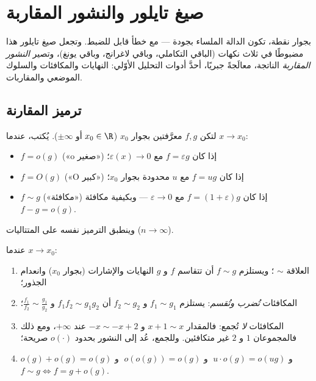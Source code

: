 \chapter{صيغ تايلور والنشور المقاربة}\label{ch:b1:taylor}

بجوار نقطة، تكون الدالة الملساء بجودة  --- مع خطأ
قابل للضبط. وتجعل صيغ تايلور هذا مضبوطًا في ثلاث
نكهات (الباقي التكاملي، وباقي لاغرانج، وباقي يونغ)،
وتصير \emph{النشور المقاربة} الناتجة، معالَجةً
جبريًا، أحدَّ أدوات التحليل الأوّلي:
النهايات والمكافئات والسلوك الموضعي والمقاربات.

\section{ترميز المقارنة}

\begin{definition}\label{def:b1:taylor:landau}
لتكن $f, g$ معرَّفتين بجوار $x_0$ ($x_0 \in \R$ أو $\pm\infty$). يُكتب،
عندما $x \to x_0$:
\begin{itemize}
  \item $f = o(g)$ («o صغير») إذا كان $f = \varepsilon g$ مع
        $\varepsilon(x) \to 0$؛
  \item $f = O(g)$ («O كبير») إذا كان $f = u g$ مع $u$ محدودة بجوار
        $x_0$؛
  \item $f \sim g$ («مكافئة») إذا كان
        $f = (1 + \varepsilon) g$ مع $\varepsilon \to 0$ ---
        وبكيفية مكافئة $f - g = o(g)$.
\end{itemize}
وينطبق الترميز نفسه على المتتاليات ($n \to \infty$).
\end{definition}

\begin{proposition}[القواعد]\label{prop:b1:taylor:landaurules}
عندما $x \to x_0$:
\begin{enumerate}
  \item العلاقة $\sim$ ؛ ويستلزم $f \sim g$ أن تتقاسم
        $f$ و $g$ النهايات والإشارات (بجوار $x_0$) وانعدام
        الجذور؛
  \item المكافئات \emph{تُضرب وتُقسم}: يستلزم $f_1 \sim g_1$ و $f_2
        \sim g_2$ أن $f_1 f_2 \sim g_1 g_2$ و $\frac{f_1}{f_2}
        \sim \frac{g_1}{g_2}$؛
  \item المكافئات \emph{لا} تُجمع: فالمقدار $x + 1 \sim x$ و $-x \sim
        -x + 2$ عند $+\infty$، ومع ذلك فالمجموعان $1$ و $2$ غير
        متكافئين. وللجمع، عُد إلى النشور بحدود
        $o(\cdot)$ صريحة؛
  \item $o(g) + o(g) = o(g)$ و $\;u \cdot o(g) = o(ug)$ و $\;o(o(g)) =
        o(g)$ و $f \sim g \iff f = g + o(g)$.
\end{enumerate}
\end{proposition}

